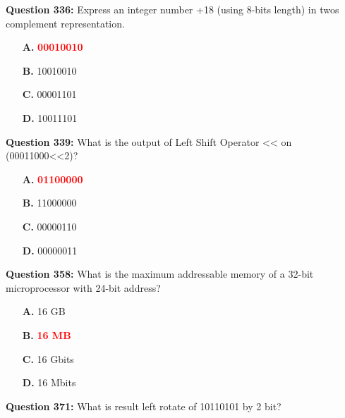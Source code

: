 \documentclass[12pt,a4paper]{article}
\begin{document}
\vspace{0.5cm}

\vspace{0.5cm}

\textbf{Question 336:} Express an integer number +18 (using 8-bits length) in twos complement representation.

\begin{itemize}
    \item[\textbf{A.}] \textcolor{red}{\textbf{00010010}}
    \item[\textbf{B.}] 10010010
    \item[\textbf{C.}] 00001101
    \item[\textbf{D.}] 10011101
\end{itemize}

\vspace{0.5cm}

\vspace{0.5cm}

\textbf{Question 339:} What is the output of Left Shift Operator << on (00011000<<2)?

\begin{itemize}
    \item[\textbf{A.}] \textcolor{red}{\textbf{01100000}}
    \item[\textbf{B.}] 11000000
    \item[\textbf{C.}] 00000110
    \item[\textbf{D.}] 00000011
\end{itemize}

\vspace{0.5cm}

\vspace{0.5cm}

\textbf{Question 358:} What is the maximum addressable memory of a 32-bit microprocessor with 24-bit address?

\begin{itemize}
    \item[\textbf{A.}] 16 GB
    \item[\textbf{B.}] \textcolor{red}{\textbf{16 MB}}
    \item[\textbf{C.}] 16 Gbits
    \item[\textbf{D.}] 16 Mbits
\end{itemize}

\vspace{0.5cm}

\vspace{0.5cm}

\textbf{Question 371:} What is result left rotate of 10110101 by 2 bit?
\end{document}
